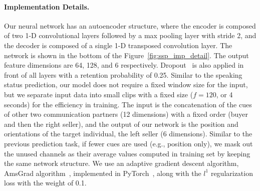 
\paragraph{Implementation Details.}
Our neural network has an autoencoder structure, where the encoder is composed of two 1-D convolutional layers followed by a max pooling layer with stride 2, and the decoder is composed of a single 1-D transposed convolution layer. The network is shown in the bottom of the Figure~\ref{fig:ssp_imp_detail}. The output feature dimensions are 64, 128, and 6 respectively. Dropout~\cite{srivastava2014dropout} is also applied in front of all layers with a retention probability of 0.25. Similar to the speaking status prediction, our model does not require a fixed window size for the input, but we separate input data into small clips with a fixed size ($f=120$, or 4 seconds) for the efficiency in training. The input is the concatenation of the cues of other two communication partners (12 dimensions) with a fixed order (buyer and then the right seller), and the output of our network is the position and orientations of the target individual, the left seller (6 dimensions). Similar to the previous prediction task, if fewer cues are used (e.g., position only), we mask out the unused channels as their average values computed in training set by keeping the same network structure. We use an adaptive gradient descent algorithm, AmsGrad algorithm~\cite{reddi2018convergence}, implemented in PyTorch~\cite{paszke2017automatic}, along with the $l^1$ regularization loss with the weight of 0.1.


